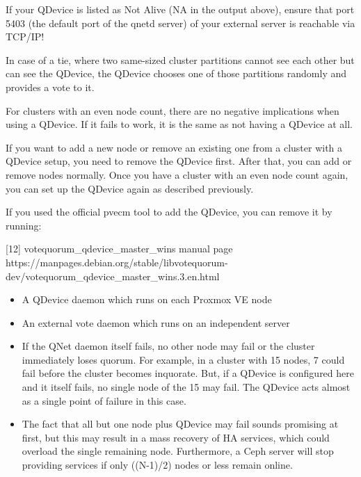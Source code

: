 If your QDevice is listed as Not Alive (NA in the output above), ensure that port 5403 (the default port of the qnetd server) of your external server is reachable via TCP/IP!

In case of a tie, where two same-sized cluster partitions cannot see each other but can see the QDevice, the QDevice chooses one of those partitions randomly and provides a vote to it.

For clusters with an even node count, there are no negative implications when using a QDevice. If it fails to work, it is the same as not having a QDevice at all.

If you want to add a new node or remove an existing one from a cluster with a QDevice setup, you need to remove the QDevice first. After that, you can add or remove nodes normally. Once you have a cluster with an even node count again, you can set up the QDevice again as described previously.

If you used the official pvecm tool to add the QDevice, you can remove it by running:

[12] votequorum_qdevice_master_wins manual page https://manpages.debian.org/stable/libvotequorum-dev/votequorum_qdevice_master_wins.3.en.html

\begin{itemize}[leftmargin=2cm]

	\item A QDevice daemon which runs on each Proxmox VE node

	\item An external vote daemon which runs on an independent server

\end{itemize}

\begin{itemize}[leftmargin=2cm]

	\item If the QNet daemon itself fails, no other node may fail or the cluster immediately loses quorum. For example, in a cluster with 15 nodes, 7 could fail before the cluster becomes inquorate. But, if a QDevice is configured here and it itself fails, no single node of the 15 may fail. The QDevice acts almost as a single point of failure in this case.

	\item The fact that all but one node plus QDevice may fail sounds promising at first, but this may result in a mass recovery of HA services, which could overload the single remaining node. Furthermore, a Ceph server will stop providing services if only ((N-1)/2) nodes or less remain online.

\end{itemize}

